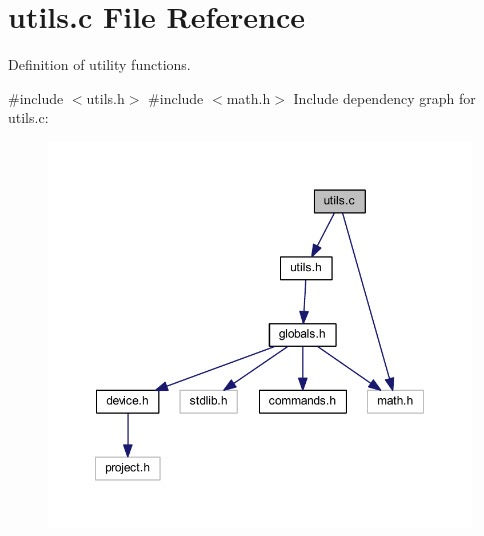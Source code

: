 \section{utils.\+c File Reference}
\label{utils_8c}


Definition of utility functions.  


{\ttfamily \#include $<$utils.\+h$>$}\newline
{\ttfamily \#include $<$math.\+h$>$}\newline
Include dependency graph for utils.\+c\+:\nopagebreak
\begin{figure}[H]
\begin{center}
\leavevmode
\includegraphics[width=350pt]{utils_8c__incl}
\end{center}
\end{figure}
